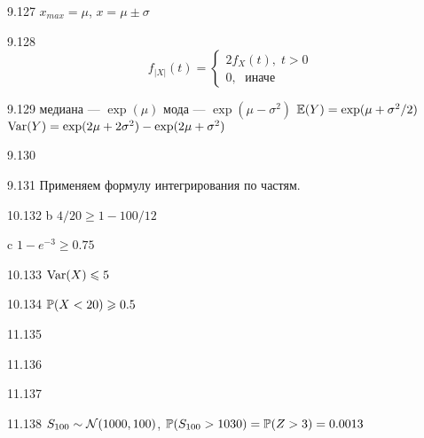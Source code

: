 \protect \hypertarget {soln:9.127}{}
\begin{solution}{{9.127}}
$x_{max}=\mu$, $x=\mu \pm \sigma$
\end{solution}
\protect \hypertarget {soln:9.128}{}
\begin{solution}{{9.128}}
  \[
  f_{|X|}(t) =
  \begin{cases}
  2f_X(t), \; t>0 \\
  0, \; \text{ иначе }
  \end{cases}
  \]
\end{solution}
\protect \hypertarget {soln:9.129}{}
\begin{solution}{{9.129}}
  медиана — $\exp(\mu)$
  мода — $\exp(\mu - \sigma^2)$
  $\E(Y)=\exp(\mu+\sigma^2/2)$
  $\Var(Y)=\exp(2\mu + 2\sigma^2)-\exp(2\mu + \sigma^2)$

\end{solution}
\protect \hypertarget {soln:9.130}{}
\begin{solution}{{9.130}}
\end{solution}
\protect \hypertarget {soln:9.131}{}
\begin{solution}{{9.131}}
  Применяем формулу интегрирования по частям.
\end{solution}
\protect \hypertarget {soln:10.132}{}
\begin{solution}{{10.132}}
  b $4/20\geq 1-100/12$

  c $1-e^{-3}\geq 0.75$
\end{solution}
\protect \hypertarget {soln:10.133}{}
\begin{solution}{{10.133}}
  $\Var(X)\leq 5$
\end{solution}
\protect \hypertarget {soln:10.134}{}
\begin{solution}{{10.134}}
  $\P(X<20) \geq 0.5$
\end{solution}
\protect \hypertarget {soln:11.135}{}
\begin{solution}{{11.135}}
\end{solution}
\protect \hypertarget {soln:11.136}{}
\begin{solution}{{11.136}}
\end{solution}
\protect \hypertarget {soln:11.137}{}
\begin{solution}{{11.137}}
\end{solution}
\protect \hypertarget {soln:11.138}{}
\begin{solution}{{11.138}}
  $S_{100} \sim \cN(1000, 100)$, $\P(S_{100}>1030)=\P(Z>3)=0.0013$
\end{solution}
\protect \hypertarget {soln:11.139}{}
